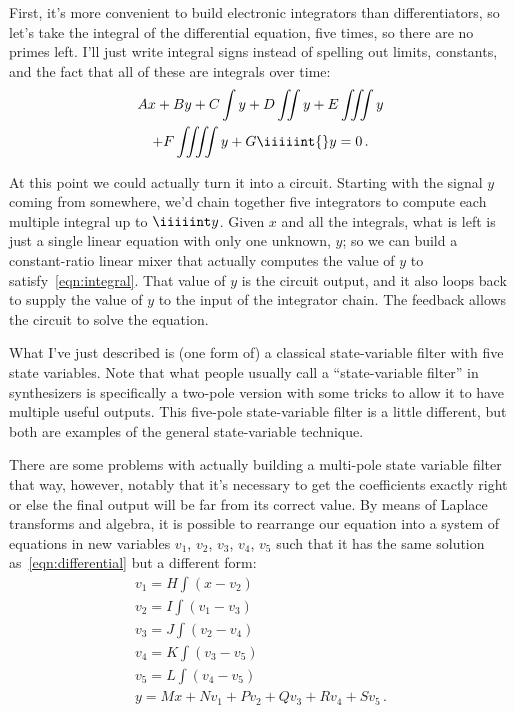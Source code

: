 First, it's more convenient to build electronic integrators than
differentiators, so let's take the integral of the differential equation,
five times, so there are no primes left.  I'll just write integral signs
instead of spelling out limits, constants, and the fact that all of these
are integrals over time:
\begin{multline}
  Ax+By+C\int y+D\iint y+E\iiint y \\ +F\iiiint y+G\iiiiint{} y = 0 \, .
  \label{eqn:integral}
\end{multline}

At this point we could actually turn it into a circuit.  Starting with the
signal $y$ coming from somewhere, we'd chain together five integrators
to compute each multiple integral up to $\iiiiint y$.  Given $x$
and all the integrals, what is left is just a single linear equation with
only one unknown, $y$; so we can build a constant-ratio linear mixer that
actually computes the value of $y$ to satisfy~\eqref{eqn:integral}.  That
value of $y$ is the circuit output, and it also loops back to supply the
value of $y$ to the input of the integrator chain.  The feedback allows the
circuit to solve the equation.

What I've just described is (one form of) a classical state-variable filter
with five state variables.  Note that what people usually call a
``state-variable filter'' in synthesizers is specifically a two-pole version
with some tricks to allow it to have multiple useful outputs.  This
five-pole state-variable filter is a little different, but both are examples
of the general state-variable technique.

There are some problems with actually building a multi-pole state variable
filter that way, however, notably that it's necessary to get the
coefficients exactly right or else the final output will be far from its
correct value.  By means of Laplace transforms and algebra, it is
possible to rearrange our equation into a system of equations in new
variables $v_1$, $v_2$, $v_3$, $v_4$, $v_5$ such that it has the same
solution as~\eqref{eqn:differential} but a different form:
\begin{equation}
  \begin{gathered}
  v_1 = H\int(x-v_2) \\
  v_2 = I\int(v_1-v_3) \\
  v_3 = J\int(v_2-v_4) \\
  v_4 = K\int(v_3-v_5) \\
  v_5 = L\int(v_4-v_5) \\
  y = Mx+Nv_1+Pv_2+Qv_3+Rv_4+Sv_5 \, .
  \end{gathered}\label{eqn:tridiagonal}
\end{equation}

